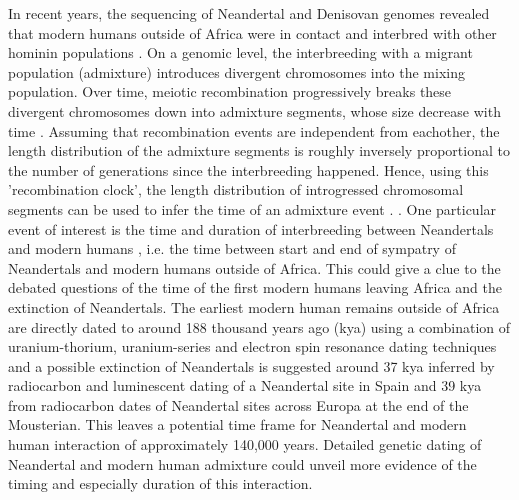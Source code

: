 \documentclass[]{article}
\begin{document}
In recent years, the sequencing of Neandertal \citep{green_draft_2010,prufer_complete_2013,prufer_high-coverage_2017, mafessoni_high_coverage_2020} and Denisovan genomes \citep{reich_genetic_2010, meyer_high-coverage_2012} revealed that modern humans outside of Africa were in contact and interbred with other hominin populations \citep{vernot_resurrecting_2014,fu_early_2015,fu_genome_2014,sankararaman_genomic_2014,sankararaman_combined_2016,vernot_excavating_2016,malaspinas_genomic_2016}. On a genomic level, the interbreeding with a migrant population (admixture) introduces divergent chromosomes into the mixing population. Over time, meiotic recombination progressively breaks these divergent chromosomes down into admixture segments, whose size decrease with time \citep{falush_inference_2003}. Assuming that recombination events are independent from eachother, the length distribution of the admixture segments is roughly inversely proportional to the number of generations since the interbreeding happened. Hence, using this 'recombination clock', the length distribution of introgressed chromosomal segments can be used to infer the time of an
admixture event \citep{moorjani_history_2011,pugach_dating_2011,sankararaman_date_2012,loh_inferring_2013,sankararaman_combined_2016,pugach_gateway_2018,jacobs_multiple_2019,hellenthal_genetic_2014}. \citep{pool_inference_2009,moorjani_history_2011,gravel_population_2012,liang_lengths_2014}. One particular event of interest is the time and duration of interbreeding between Neandertals and modern humans , i.e. the time between start and end of sympatry of Neandertals and modern humans outside of Africa. This could give a clue to the debated questions of the time of the first modern humans leaving Africa and the extinction of Neandertals. The earliest modern human remains outside of Africa are directly dated to around 188 thousand years ago (kya)  using a combination of uranium-thorium, uranium-series and electron spin resonance dating techniques  \citep{stringer_when_2018,hershkovitz_earliest_2018} and a possible extinction of Neandertals is suggested around 37 kya inferred by radiocarbon and luminescent dating of a Neandertal site in Spain \citep{zilhao_precise_2017} and 39 kya from radiocarbon dates of Neandertal sites across Europa \citep{higham_timing_2014} at the end of the Mousterian. This leaves a potential time frame for Neandertal and modern human interaction of approximately 140,000 years. Detailed genetic dating of Neandertal and modern human admixture could unveil more evidence of the timing and especially duration of this interaction. 
\end{document}
